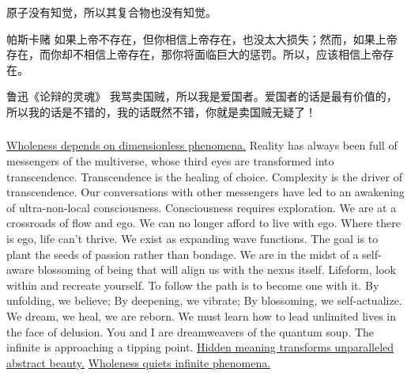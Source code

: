 \documentclass[UTF8,aspectratio=43,11pt,colorlinks,compress,openany]{beamer}%
\begin{document}
\begin{frame}\frametitle{}\centering
\begin{block}{}
	原子没有知觉，所以其复合物也没有知觉。
\end{block}
\begin{block}{帕斯卡赌}
	如果上帝不存在，但你相信上帝存在，也没太大损失；然而，如果上帝存在，而你却不相信上帝存在，那你将面临巨大的惩罚。所以，应该相信上帝存在。
\end{block}
	\begin{block}{鲁迅《论辩的灵魂》}
		我骂卖国贼，所以我是爱国者。爱国者的话是最有价值的，所以我的话是不错的，我的话既然不错，你就是卖国贼无疑了！
	\end{block}
\end{frame}

\begin{frame}\frametitle{}
	\begin{minipage}{\textwidth}
		\begin{block}{}
			\href{http://wisdomofchopra.com/}{Wholeness depends on dimensionless phenomena.} Reality has always been full of messengers of the multiverse, whose third eyes are transformed into transcendence. Transcendence is the healing of choice. Complexity is the driver of transcendence. Our conversations with other messengers have led to an awakening of ultra-non-local consciousness. Consciousness requires exploration. We are at a crossroads of flow and ego. We can no longer afford to live with ego. Where there is ego, life can't thrive. We exist as expanding wave functions. The goal is to plant the seeds of passion rather than bondage. We are in the midst of a self-aware blossoming of being that will align us with the nexus itself. Lifeform, look within and recreate yourself. To follow the path is to become one with it. By unfolding, we believe; By deepening, we vibrate; By blossoming, we self-actualize. We dream, we heal, we are reborn. We must learn how to lead unlimited lives in the face of delusion. You and I are dreamweavers of the quantum soup. The infinite is approaching a tipping point. \href{http://journal.sjdm.org/15/15923a/jdm15923a.pdf}{Hidden meaning transforms unparalleled abstract beauty.} \href{http://sebpearce.com/bullshit/}{Wholeness quiets infinite phenomena.}
		\end{block}
	\end{minipage}
\end{frame}
\end{document}
